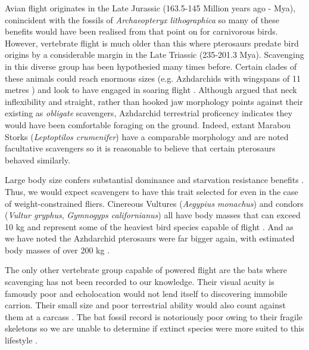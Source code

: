 \documentclass[a4paper,12pt]{article}
\begin{document}
Avian flight originates in the Late Jurassic (163.5-145 Million years ago - Mya), conincident with the fossils of \textit{Archaeopteryx lithographica} so many of these benefits would have been realised from that point on for carnivorous birds. However, vertebrate flight is much older than this where pterosaurs predate bird origins by a considerable margin in the Late Triassic (235-201.3 Mya). Scavenging in this diverse group has been hypothesied many times before. Certain clades of these animals could reach enormous sizes (e.g. Azhdarchids with wingspans of 11 metres \citep{witton2010size}) and look to have engaged in soaring flight \citep{witton2010size}. Although \cite{witton2008reappraisal} argued that neck inflexibility and straight, rather than hooked jaw morphology points against their existing as \textit{obligate} scavengers, Azhdarchid terrestrial proficency indicates they would have been comfortable foraging on the ground. Indeed, extant Marabou Storks (\textit{Leptoptilos crumenifer}) %
have a comparable morphology and are noted facultative scavengers so it is reasonable to believe that certain pterosaurs behaved similarly.  

Large body size confers substantial dominance and starvation resistance benefits \citep{ruxton2004obligate}. Thus, we would expect scavengers to have this trait selected for even in the case of weight-constrained fliers. Cinereous Vultures (\textit{Aegypius monachus}) and condors (\textit{Vultur gryphus}, \textit{Gymnogyps californianus}) all have body masses that can exceed 10 kg and represent some of the heaviest bird species capable of flight \citep{ferguson2001raptors,donazar2002effects}. And as we have noted the Azhdarchid pterosaurs were far bigger again, with estimated body masses of over 200 kg \citep{witton2010size}.  %
 
The only other vertebrate group capable of powered flight are the bats where scavenging has not been recorded to our knowledge. Their visual acuity is famously poor and echolocation would not lend itself to discovering immobile carrion. Their small size and poor terrestrial ability would also count against them at a carcass \citep{riskin2006terrestrial}. The bat fossil record is notoriously poor owing to their fragile skeletons so we are unable to determine if extinct species were more suited to this lifestyle \citep{eiting2009global}.
\end{document}
